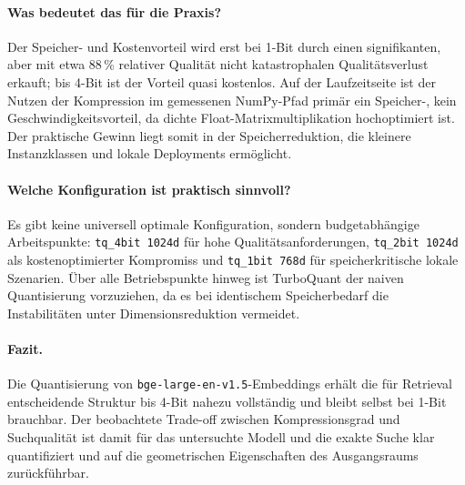 \paragraph{Was bedeutet das für die Praxis?}
Der Speicher- und Kostenvorteil wird erst bei 1-Bit durch einen signifikanten, aber mit etwa 88\,\% relativer Qualität nicht katastrophalen Qualitätsverlust erkauft; bis 4-Bit ist der Vorteil quasi kostenlos.
Auf der Laufzeitseite ist der Nutzen der Kompression im gemessenen NumPy-Pfad primär ein Speicher-, kein Geschwindigkeitsvorteil, da dichte Float-Matrixmultiplikation hochoptimiert ist.
Der praktische Gewinn liegt somit in der Speicherreduktion, die kleinere Instanzklassen und lokale Deployments ermöglicht.
%
\paragraph{Welche Konfiguration ist praktisch sinnvoll?}
Es gibt keine universell optimale Konfiguration, sondern budgetabhängige Arbeitspunkte: \texttt{tq\_4bit 1024d} für hohe Qualitätsanforderungen, \texttt{tq\_2bit 1024d} als kostenoptimierter Kompromiss und \texttt{tq\_1bit 768d} für speicherkritische lokale Szenarien.
Über alle Betriebspunkte hinweg ist TurboQuant der naiven Quantisierung vorzuziehen, da es bei identischem Speicherbedarf die Instabilitäten unter Dimensionsreduktion vermeidet.
%
\paragraph{Fazit.}
Die Quantisierung von \texttt{bge-\allowbreak large-\allowbreak en-\allowbreak v1.5}-Embeddings erhält die für Retrieval entscheidende Struktur bis 4-Bit nahezu vollständig und bleibt selbst bei 1-Bit brauchbar.
Der beobachtete Trade-off zwischen Kompressionsgrad und Suchqualität ist damit für das untersuchte Modell und die exakte Suche klar quantifiziert und auf die geometrischen Eigenschaften des Ausgangsraums zurückführbar.
%

